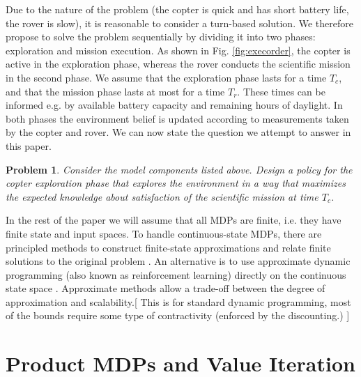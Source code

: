 \documentclass[conference]{IEEEtran}
\newtheorem{problem}{Problem}
\newcommand{\sofie}[1]{{\color{orange}[ #1 ]}}
\begin{document}
Due to the nature of the problem (the copter is quick and has short battery life, the rover is slow), it is reasonable to consider a turn-based solution. We therefore propose to solve the problem sequentially by dividing it into two phases: exploration and mission execution. As shown in Fig. \ref{fig:execorder}, the copter is active in the exploration phase, whereas the rover conducts the scientific mission in the second phase. We assume that the exploration phase lasts for a time $T_c$, and that the mission phase lasts at most for a time $T_r$. These times can be informed e.g. by available battery capacity and remaining hours of daylight. In both phases the environment belief is updated according to measurements taken by the copter and rover. We can now state the question we attempt to answer in this paper.
\begin{problem}
\label{prob:main}
  Consider the model components listed above. Design a policy for the copter exploration phase that explores the environment in a way that maximizes the expected knowledge about satisfaction of the scientific mission at time $T_c$.
\end{problem}

In the rest of the paper we will assume that all MDPs are finite, i.e. they have finite state and input spaces. To handle continuous-state MDPs, there are principled methods to construct finite-state approximations and relate finite solutions to the original problem \cite{Zamani2015,Haesaert2017}. An alternative is to use approximate dynamic programming (also known as reinforcement learning) directly on the continuous state space \cite{Powell2011}. Approximate methods allow a trade-off between the degree of approximation and scalability.\sofie{This is for standard dynamic programming, most of the bounds require some type of contractivity (enforced by the discounting.)}


\section{Product MDPs and Value Iteration}
\end{document}
